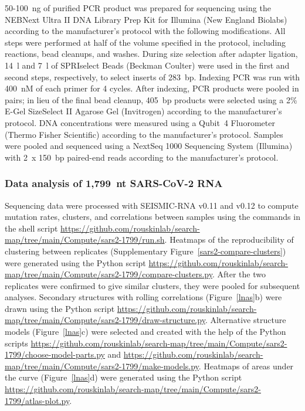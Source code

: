 \documentclass[main.tex]{subfiles}
\begin{document}
50-100~ng of purified PCR product was prepared for sequencing using the NEBNext Ultra II DNA Library Prep Kit for Illumina (New England Biolabs) according to the manufacturer's protocol with the following modifications.
All steps were performed at half of the volume specified in the protocol, including reactions, bead cleanups, and washes.
During size selection after adapter ligation, 14~\textmu l and 7~\textmu l of SPRIselect Beads (Beckman Coulter) were used in the first and second steps, respectively, to select inserts of 283~bp.
Indexing PCR was run with 400~nM of each primer for 4 cycles.
After indexing, PCR products were pooled in pairs; in lieu of the final bead cleanup, 405~bp products were selected using a 2\% E-Gel SizeSelect II Agarose Gel (Invitrogen) according to the manufacturer's protocol.
DNA concentrations were measured using a Qubit~4 Fluorometer (Thermo Fisher Scientific) according to the manufacturer's protocol.
Samples were pooled and sequenced using a NextSeq 1000 Sequencing System (Illumina) with 2~x 150~bp paired-end reads according to the manufacturer's protocol.

\subsubsection{Data analysis of 1,799~nt SARS-CoV-2 RNA}

Sequencing data were processed with SEISMIC-RNA v0.11 and v0.12 to compute mutation rates, clusters, and correlations between samples using the commands in the shell script \url{https://github.com/rouskinlab/search-map/tree/main/Compute/sars2-1799/run.sh}.
Heatmaps of the reproducibility of clustering between replicates (Supplementary Figure~\ref{sars2-compare-clusters}) were generated using the Python script \url{https://github.com/rouskinlab/search-map/tree/main/Compute/sars2-1799/compare-clusters.py}.
After the two replicates were confirmed to give similar clusters, they were pooled for subsequent analyses.
Secondary structures with rolling correlations (Figure~\ref{lnas}b) were drawn using the Python script \url{https://github.com/rouskinlab/search-map/tree/main/Compute/sars2-1799/draw-structure.py}.
Alternative structure models (Figure~\ref{lnas}c) were selected and created with the help of the Python scripts \url{https://github.com/rouskinlab/search-map/tree/main/Compute/sars2-1799/choose-model-parts.py} and \url{https://github.com/rouskinlab/search-map/tree/main/Compute/sars2-1799/make-models.py}.
Heatmaps of areas under the curve (Figure~\ref{lnas}d) were generated using the Python script \url{https://github.com/rouskinlab/search-map/tree/main/Compute/sars2-1799/atlas-plot.py}.
\end{document}
